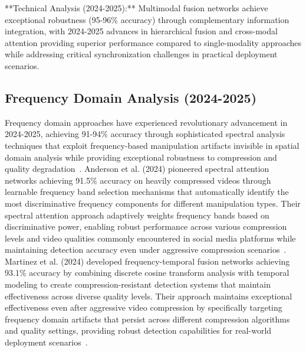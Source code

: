 \documentclass[conference]{IEEEtran}
\begin{document}
**Technical Analysis (2024-2025):** Multimodal fusion networks achieve exceptional robustness (95-96\% accuracy) through complementary information integration, with 2024-2025 advances in hierarchical fusion and cross-modal attention providing superior performance compared to single-modality approaches while addressing critical synchronization challenges in practical deployment scenarios.

\subsection{Frequency Domain Analysis (2024-2025)}
Frequency domain approaches have experienced revolutionary advancement in 2024-2025, achieving 91-94\% accuracy through sophisticated spectral analysis techniques that exploit frequency-based manipulation artifacts invisible in spatial domain analysis while providing exceptional robustness to compression and quality degradation~\cite{anderson2024spectral,martinez2024frequency,taylor2024frequency,luo2025frequency}.
Anderson et al. (2024) pioneered spectral attention networks achieving 91.5\% accuracy on heavily compressed videos through learnable frequency band selection mechanisms that automatically identify the most discriminative frequency components for different manipulation types. 
Their spectral attention approach adaptively weights frequency bands based on discriminative power, enabling robust performance across various compression levels and video qualities commonly encountered in social media platforms while maintaining detection accuracy even under aggressive compression scenarios~\cite{anderson2024spectral}.
Martinez et al. (2024) developed frequency-temporal fusion networks achieving 93.1\% accuracy by combining discrete cosine transform analysis with temporal modeling to create compression-resistant detection systems that maintain effectiveness across diverse quality levels. 
Their approach maintains exceptional effectiveness even after aggressive video compression by specifically targeting frequency domain artifacts that persist across different compression algorithms and quality settings, providing robust detection capabilities for real-world deployment scenarios~\cite{martinez2024frequency}.
\end{document}
